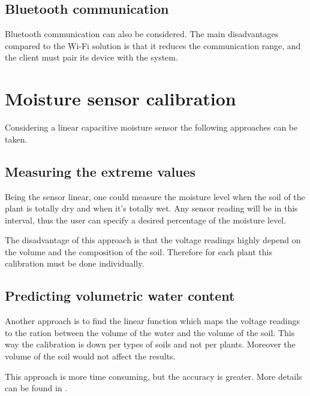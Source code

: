 \subsection{Bluetooth communication}

Bluetooth communication can also be considered. The main disadvantages compared to the Wi-Fi solution is that it reduces the communication range, and the client must pair its device with the system.







\section{Moisture sensor calibration}

Considering a linear capacitive moisture sensor the following approaches can be taken.

\subsection{Measuring the extreme values}

Being the sensor linear, one could measure the moisture level when the soil of the plant is totally dry and when it's totally wet. Any sensor reading will be in this interval, thus the user can specify a desired percentage of the moisture level.

The disadvantage of this approach is that the voltage readings  highly depend on the volume and the composition of the soil. Therefore for each plant this calibration must be done individually.


\subsection{Predicting volumetric water content}

Another approach is to find the linear function which maps the voltage readings to the ration between the volume of the water and the volume of the soil. This way the calibration is down per types of soils and not per plants. Moreover the volume of the soil would not affect the results.

This approach is more time consuming, but the accuracy is greater. More details can be found in \cite{Hrisko20}.
